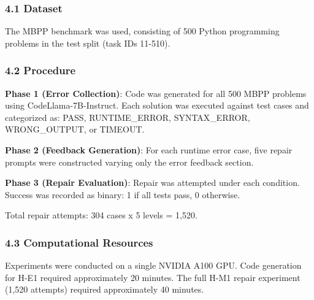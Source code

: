 
\subsubsection{4.1 Dataset}

The MBPP benchmark \citep{austin2021mbpp} was used, consisting of 500 Python programming problems in the test split (task IDs 11-510).

\begin{table}[htbp]
\centering
{}
\end{table}

\subsubsection{4.2 Procedure}

\textbf{Phase 1 (Error Collection)}: Code was generated for all 500 MBPP problems using CodeLlama-7B-Instruct. Each solution was executed against test cases and categorized as: PASS, RUNTIME\_ERROR, SYNTAX\_ERROR, WRONG\_OUTPUT, or TIMEOUT.

\textbf{Phase 2 (Feedback Generation)}: For each runtime error case, five repair prompts were constructed varying only the error feedback section.

\textbf{Phase 3 (Repair Evaluation)}: Repair was attempted under each condition. Success was recorded as binary: 1 if all tests pass, 0 otherwise.

Total repair attempts: 304 cases x 5 levels = 1,520.

\subsubsection{4.3 Computational Resources}

Experiments were conducted on a single NVIDIA A100 GPU. Code generation for H-E1 required approximately 20 minutes. The full H-M1 repair experiment (1,520 attempts) required approximately 40 minutes.
